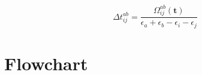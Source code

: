 \begin{equation}
  \Delta t_{ij}^{ab} = \frac{\Omega_{ij}^{ab}(\mathbf{t})}
  {\epsilon_a + \epsilon_b - \epsilon_i - \epsilon_j}
\end{equation}



\newpage
\section{Flowchart}
\label{sec:ccsd_flowchart}





